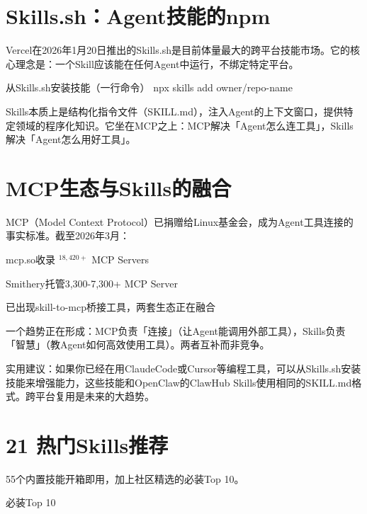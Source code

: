 \documentclass[
  10
]{article}
\newenvironment{Shaded}{}{}
\newcommand{\NormalTok}[1]{#1}
\begin{document}
\section{Skills.sh：Agent技能的npm}\label{skills.shagentux6280ux80fdux7684npm}

Vercel在2026年1月20日推出的Skills.sh是目前体量最大的跨平台技能市场。它的核心理念是：一个Skill应该能在任何Agent中运行，不绑定特定平台。

\begin{Shaded}
\begin{Highlighting}[]
\NormalTok{从Skills.sh安装技能（一行命令）  }
\NormalTok{npx skills add owner/repo{-}name}
\end{Highlighting}
\end{Shaded}

Skills本质上是结构化指令文件（SKILL.md），注入Agent的上下文窗口，提供特定领域的程序化知识。它坐在MCP之上：MCP解决「Agent怎么连工具」，Skills解决「Agent怎么用好工具」。

\section{MCP生态与Skills的融合}\label{mcpux751fux6001ux4e0eskillsux7684ux878dux5408}

MCP（Model Context
Protocol）已捐赠给Linux基金会，成为Agent工具连接的事实标准。截至2026年3月：

mcp.so收录 \(^ { 1 8 , 4 2 0 + }\) MCP Servers

Smithery托管3,300-7,300+ MCP Server

已出现skill-to-mcp桥接工具，两套生态正在融合

一个趋势正在形成：MCP负责「连接」（让Agent能调用外部工具），Skills负责「智慧」（教Agent如何高效使用工具）。两者互补而非竞争。

实用建议：如果你已经在用ClaudeCode或Cursor等编程工具，可以从Skills.sh安装技能来增强能力，这些技能和OpenClaw的ClawHub
Skills使用相同的SKILL.md格式。跨平台复用是未来的大趋势。

\section{21 热门Skills推荐}\label{ux70edux95e8skillsux63a8ux8350}

55个内置技能开箱即用，加上社区精选的必装Top 10。

必装Top 10
\end{document}
